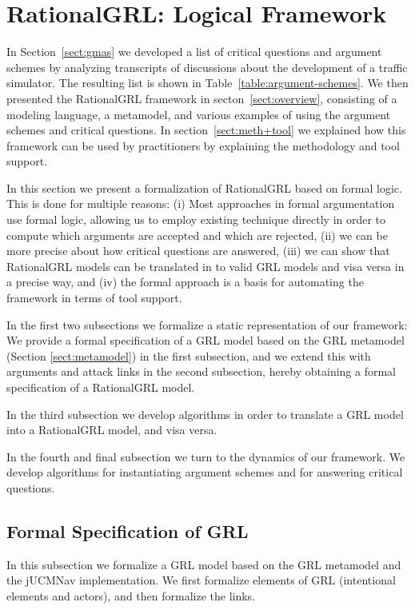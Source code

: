 \section{RationalGRL: Logical Framework}
\label{sect:formalframework}

In Section~\ref{sect:gmas} we developed a list of critical questions and argument schemes by analyzing transcripts of discussions about the development of a traffic simulator. The resulting list is shown in Table~\ref{table:argument-schemes}. We then presented the RationalGRL framework in secton~\ref{sect:overview}, consisting of a modeling language, a metamodel, and various examples of using the argument schemes and critical questions. In section~\ref{sect:meth+tool} we explained how this framework can be used by practitioners by explaining the methodology and tool support.

In this section we present a formalization of RationalGRL based on formal logic. This is done for multiple reasons: (i) Most approaches in formal argumentation use formal logic, allowing us to employ existing technique directly in order to compute which arguments are accepted and which are rejected, (ii) we can be more precise about how critical questions are answered, (iii) we can show that RationalGRL models can be translated in to valid GRL models and visa versa in a precise way, and (iv) the formal approach is a basis for automating the framework in terms of tool support.

In the first two subsections we formalize a static representation of our framework: We provide a formal specification of a GRL model based on the GRL metamodel (Section \ref{sect:metamodel}) in the first subsection, and we extend this with arguments and attack links in the second subsection, hereby obtaining a formal specification of a RationalGRL model. 

In the third subsection we develop algorithms in order to translate a GRL model into a RationalGRL model, and visa versa.

In the fourth and final subsection we turn to the dynamics of our framework. We develop algorithms for instantiating argument schemes and for answering critical questions. 

\subsection{Formal Specification of GRL}
\label{sect:formalframework:grl}

In this subsection we formalize a GRL model based on the GRL metamodel and the jUCMNav implementation. We first formalize elements of GRL (intentional elements and actors), and then formalize the links.

